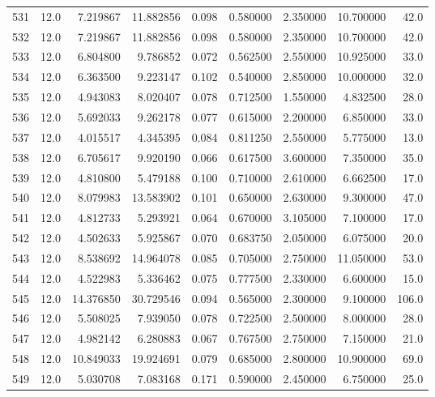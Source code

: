 \begin{tabular}{lrrrrrrrr}
531  &   12.0 &   7.219867 &  11.882856 &  0.098 &  0.580000 &  2.350000 &  10.700000 &   42.0 \\
532  &   12.0 &   7.219867 &  11.882856 &  0.098 &  0.580000 &  2.350000 &  10.700000 &   42.0 \\
533  &   12.0 &   6.804800 &   9.786852 &  0.072 &  0.562500 &  2.550000 &  10.925000 &   33.0 \\
534  &   12.0 &   6.363500 &   9.223147 &  0.102 &  0.540000 &  2.850000 &  10.000000 &   32.0 \\
535  &   12.0 &   4.943083 &   8.020407 &  0.078 &  0.712500 &  1.550000 &   4.832500 &   28.0 \\
536  &   12.0 &   5.692033 &   9.262178 &  0.077 &  0.615000 &  2.200000 &   6.850000 &   33.0 \\
537  &   12.0 &   4.015517 &   4.345395 &  0.084 &  0.811250 &  2.550000 &   5.775000 &   13.0 \\
538  &   12.0 &   6.705617 &   9.920190 &  0.066 &  0.617500 &  3.600000 &   7.350000 &   35.0 \\
539  &   12.0 &   4.810800 &   5.479188 &  0.100 &  0.710000 &  2.610000 &   6.662500 &   17.0 \\
540  &   12.0 &   8.079983 &  13.583902 &  0.101 &  0.650000 &  2.630000 &   9.300000 &   47.0 \\
541  &   12.0 &   4.812733 &   5.293921 &  0.064 &  0.670000 &  3.105000 &   7.100000 &   17.0 \\
542  &   12.0 &   4.502633 &   5.925867 &  0.070 &  0.683750 &  2.050000 &   6.075000 &   20.0 \\
543  &   12.0 &   8.538692 &  14.964078 &  0.085 &  0.705000 &  2.750000 &  11.050000 &   53.0 \\
544  &   12.0 &   4.522983 &   5.336462 &  0.075 &  0.777500 &  2.330000 &   6.600000 &   15.0 \\
545  &   12.0 &  14.376850 &  30.729546 &  0.094 &  0.565000 &  2.300000 &   9.100000 &  106.0 \\
546  &   12.0 &   5.508025 &   7.939050 &  0.078 &  0.722500 &  2.500000 &   8.000000 &   28.0 \\
547  &   12.0 &   4.982142 &   6.280883 &  0.067 &  0.767500 &  2.750000 &   7.150000 &   21.0 \\
548  &   12.0 &  10.849033 &  19.924691 &  0.079 &  0.685000 &  2.800000 &  10.900000 &   69.0 \\
549  &   12.0 &   5.030708 &   7.083168 &  0.171 &  0.590000 &  2.450000 &   6.750000 &   25.0 \\

\end{tabular}
